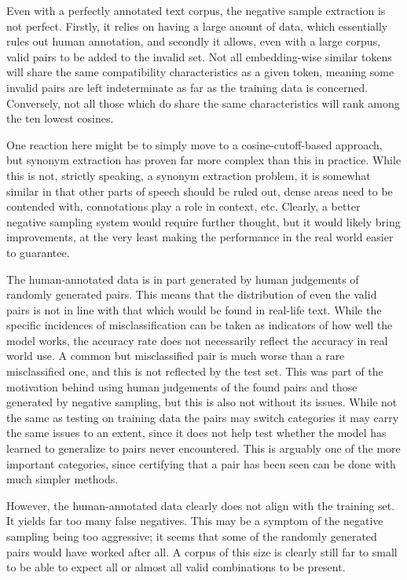 \documentclass[a4paper, 12pt]{scrartcl}
\begin{document}
Even with a perfectly annotated text corpus, the negative sample extraction is not perfect. Firstly, it relies on having a large anount of data, which essentially rules out human annotation, and secondly it allows, even with a large corpus, valid pairs to be added to the invalid set. Not all embedding-wise similar tokens will share the same compatibility characteristics as a given token, meaning some invalid pairs are left indeterminate as far as the training data is concerned. Conversely, not all those which do share the same characteristics will rank among the ten lowest cosines.

One reaction here might be to simply move to a cosine-cutoff-based approach, but synonym extraction has proven far more complex than this in practice. While this is not, strictly speaking, a synonym extraction problem, it is somewhat similar in that other parts of speech should be ruled out, dense areas need to be contended with, connotations play a role in context, etc. Clearly, a better negative sampling system would require further thought, but it would likely bring improvements, at the very least making the performance in the real world easier to guarantee.

The human-annotated data is in part generated by human judgements of randomly generated pairs. This means that the distribution of even the valid pairs is not in line with that which would be found in real-life text. While the specific incidences of misclassification can be taken as indicators of how well the model works, the accuracy rate does not necessarily reflect the accuracy in real world use. A common but misclassified pair is much worse than a rare misclassified one, and this is not reflected by the test set. This was part of the motivation behind using human judgements of the found pairs and those generated by negative sampling, but this is also not without its issues. While not the same as testing on training data \textemdash the pairs may switch categories \textemdash it may carry the same issues to an extent, since it does not help test whether the model has learned to generalize to pairs never encountered. This is arguably one of the more important categories, since certifying that a pair has been seen can be done with much simpler methods.

However, the human-annotated data clearly does not align with the training set. It yields far too many false negatives. This may be a symptom of the negative sampling being too aggressive; it seems that some of the randomly generated pairs would have worked after all. A corpus of this size is clearly still far to small to be able to expect all or almost all valid combinations to be present.
\end{document}
